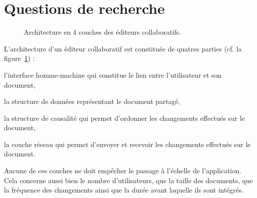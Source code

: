 
\section{Questions de recherche}

\begin{figure}
  \begin{center}
    
    \caption[Architecture des éditeurs collaboratifs]
    {\label{intro:fig:architecture} Architecture en 4 couches des éditeurs
      collaboratifs.}
  \end{center}
\end{figure}

L'architecture d'un éditeur collaboratif est constituée de quatres parties
(cf. la figure~\ref{intro:fig:architecture}) :
\begin{inparaenum}[(i)]
\item l'interface homme-machine qui constitue le lien entre l'utilisateur et son
  document, 
\item la structure de données représentant le document partagé,
\item la structure de causalité qui permet d'ordonner les changements effectués
  sur le document,
\item la couche réseau qui permet d'envoyer et recevoir les changements
  effectués sur le document.
\end{inparaenum}

Aucune de ces couches ne doit empêcher le passage à l'échelle de l'application.
Cela concerne aussi bien le nombre d'utilisateurs, que la taille des documents,
que la fréquence des changements ainsi que la durée avant laquelle ils sont
intégrés.

  

